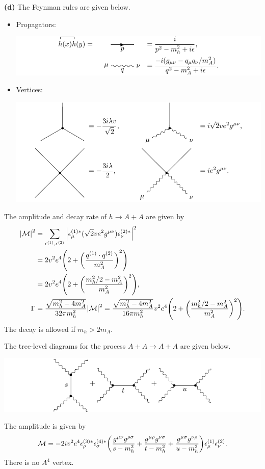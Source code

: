 \documentclass{article}
\makeatletter
\newcommand*{\shifttext}[1]{%
  \settowidth{\@tempdima}{#1}%
  \hspace{-\@tempdima}#1%
}
\newcommand{\plabel}[1]{%
\shifttext{\textbf{#1}\quad}%
}
\makeatother
\begin{document}
\plabel{(d)}%
The Feynman rules are given below.
\begin{itemize}
    \item Propagators:
    \begin{center}
        \includegraphics{img/u1/propagator/propagator.pdf}
    \end{center}
    \item Vertices:
    \begin{center}
        \includegraphics{img/u1/vertex/vertex.pdf}
    \end{center}
\end{itemize}
The amplitude and decay rate of $h\rightarrow A+A$ are given by
\begin{align*}
    \abs{\mathcal{M}}^2 &= \sum_{\epsilon^{(1)},\epsilon^{(2)}} \abs{\epsilon^{(1)*}_\mu (\sqrt{2}ve^2 g^{\mu\nu}) \epsilon^{(2)*}_\nu}^2 \\
    &= 2v^2 e^4 \qty(2+\qty(\frac{q^{(1)}\cdot q^{(2)}}{m_A^2})^2) \\
    &= 2v^2 e^4\qty(2+\qty(\frac{m_h^2/2 - m_A^2}{m_A^2})^2), \\
    \Gamma &= \frac{\sqrt{m_h^2 - 4m_A^2}}{32\pi m_h^2}\abs{\mathcal{M}}^2 = \frac{\sqrt{m_h^2 - 4m_A^2}}{16\pi m_h^2}v^2 e^4\qty(2+\qty(\frac{m_h^2/2 - m_A^2}{m_A^2})^2).
\end{align*}
The decay is allowed if $m_h>2m_A$.
\par
The tree-level diagrams for the process $A+A\rightarrow A+A$ are given below.
\begin{center}
    \includegraphics{img/u1/scatter/scalar.pdf}
\end{center}
The amplitude is given by
\[ \mathcal{M} = -2i v^2 e^4 \epsilon_\rho^{(3)*}\epsilon_\sigma^{(4)*}\qty(\frac{g^{\mu\nu}g^{\rho\sigma}}{s - m_h^2} + \frac{g^{\mu\rho}g^{\nu\sigma}}{t - m_h^2} + \frac{g^{\mu\sigma}g^{\nu\rho}}{u - m_h^2})\epsilon_\mu^{(1)}\epsilon_\nu^{(2)}. \]
There is no $A^4$ vertex.
\end{document}
